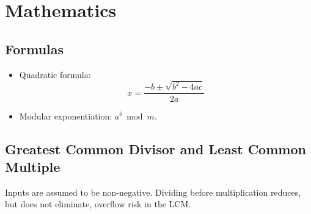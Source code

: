\section{Mathematics}

\subsection{Formulas}

\begin{itemize}
  \setlength\itemsep{0pt}
  \item Quadratic formula:
    \[
      x = \frac{-b \pm \sqrt{b^2 - 4ac}}{2a}
    \]
  \item Modular exponentiation: $a^b \bmod m$.
\end{itemize}

\subsection{Greatest Common Divisor and Least Common Multiple}

Inputs are assumed to be non-negative. Dividing before multiplication reduces, but
does not eliminate, overflow risk in the LCM.

